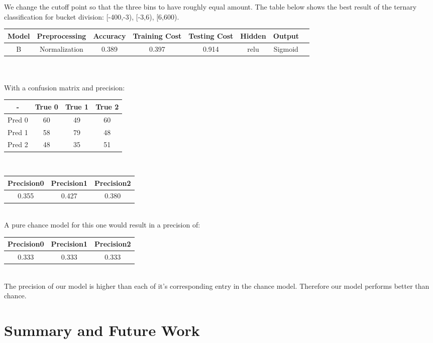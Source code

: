 \documentclass[11pt,letterpaper]{article}
\begin{document}
We change the cutoff point so that the three bins to have roughly equal amount. The table below shows the best result of the ternary classification for bucket division: [-400,-3), [-3,6), [6,600).\\

\begin{tabular}{c||ccccccc}
\hline 
Model & Preprocessing & Accuracy & Training Cost & Testing Cost & Hidden & Output \\ 
\hline 
B & Normalization & 0.389 & 0.397 & 0.914 & relu & Sigmoid \\ 
\hline 
\end{tabular} \\\\
With a confusion matrix and precision:\\
\begin{center}
\begin{tabular}{c|ccc}
- & True 0 & True 1 & True 2 \\ 
\hline 
Pred 0 & 60 & 49 & 60 \\ 
Pred 1 & 58 & 79 & 48 \\ 
Pred 2 & 48 & 35 & 51 \\ 
\end{tabular}
\end{center} 
\ \\
\begin{center}
\begin{tabular}{ccc}
\hline 
Precision0 & Precision1 & Precision2 \\ 
\hline 
0.355 & 0.427 &  0.380 \\ 
\hline 
\end{tabular}
\end{center}
\ \\

A pure chance model for this one would result in a precision of:\\
\begin{center}
\begin{tabular}{ccc}
\hline 
Precision0 & Precision1 & Precision2 \\ 
\hline 
0.333 & 0.333 &  0.333 \\ 
\hline 
\end{tabular}
\end{center}
\ \\
The precision of our model is higher than each of it's corresponding entry in the chance model. Therefore our model performs better than chance.

\section{Summary and Future Work}
\end{document}
